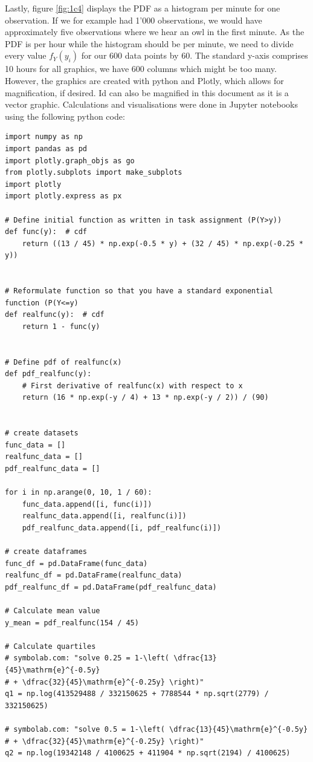 Lastly, figure \eqref{fig:1c4} displays the PDF as a histogram per minute for one observation. If we for example had 1'000 observations, we would have approximately five observations where we hear an owl in the first minute. As the PDF is per hour while the histogram should be per minute, we need to divide every value $f_Y(y_i)$ for our 600 data points by 60. The standard y-axis comprises 10 hours for all graphics, we have 600 columns which might be too many. However, the graphics are created with python and Plotly, which allows for magnification, if desired. Id can also be magnified in this document as it is a vector graphic.
Calculations and visualisations were done in Jupyter notebooks using the following python code:
\begin{verbatim}
import numpy as np
import pandas as pd
import plotly.graph_objs as go
from plotly.subplots import make_subplots
import plotly
import plotly.express as px

# Define initial function as written in task assignment (P(Y>y))
def func(y):  # cdf
    return ((13 / 45) * np.exp(-0.5 * y) + (32 / 45) * np.exp(-0.25 * y))


# Reformulate function so that you have a standard exponential function (P(Y<=y)
def realfunc(y):  # cdf
    return 1 - func(y)


# Define pdf of realfunc(x)
def pdf_realfunc(y):
    # First derivative of realfunc(x) with respect to x
    return (16 * np.exp(-y / 4) + 13 * np.exp(-y / 2)) / (90)


# create datasets
func_data = []
realfunc_data = []
pdf_realfunc_data = []

for i in np.arange(0, 10, 1 / 60):
    func_data.append([i, func(i)])
    realfunc_data.append([i, realfunc(i)])
    pdf_realfunc_data.append([i, pdf_realfunc(i)])

# create dataframes
func_df = pd.DataFrame(func_data)
realfunc_df = pd.DataFrame(realfunc_data)
pdf_realfunc_df = pd.DataFrame(pdf_realfunc_data)

# Calculate mean value
y_mean = pdf_realfunc(154 / 45)

# Calculate quartiles
# symbolab.com: "solve 0.25 = 1-\left( \dfrac{13}{45}\mathrm{e}^{-0.5y}
# + \dfrac{32}{45}\mathrm{e}^{-0.25y} \right)"
q1 = np.log(413529488 / 332150625 + 7788544 * np.sqrt(2779) / 332150625)

# symbolab.com: "solve 0.5 = 1-\left( \dfrac{13}{45}\mathrm{e}^{-0.5y}
# + \dfrac{32}{45}\mathrm{e}^{-0.25y} \right)"
q2 = np.log(19342148 / 4100625 + 411904 * np.sqrt(2194) / 4100625)


\end{verbatim}

